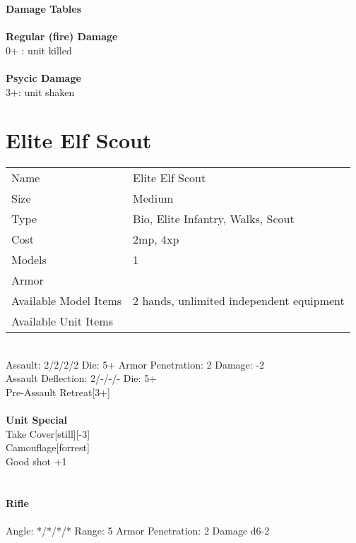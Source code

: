 {\bf Damage Tables} \\
\ \\ {\bf Regular (fire) Damage } \\
0+ : unit killed \\
\ \\ {\bf Psycic Damage } \\
3+: unit shaken \\









\pagebreak

\section{ Elite Elf Scout }

\begin{tabular}{ll}
  Name & Elite Elf Scout \\
  Size & Medium\\
  Type & Bio, Elite Infantry, Walks, Scout\\
  Cost & 2mp, 4xp\\
  Models & 1\\
  Armor & \\
  Available Model Items & 2 hands, unlimited independent equipment \\
  Available Unit Items &  \\
\end{tabular}

\ \\
Assault: 2/2/2/2 Die: 5+ Armor Penetration: 2 Damage: -2 \\
Assault Deflection: 2/-/-/- Die: 5+\\
\indent Pre-Assault Retreat[3+] \\
\ \\

{\bf Unit Special} \\
Take Cover[still][-3] \\ Camouflage[forrest] \\ Good shot +1 \\ 
\ \\
\ \\
{\bf Rifle } \\
\ \\
Angle: */*/*/* Range: 5 Armor Penetration: 2 Damage d6-2 \\
\indent  \\





